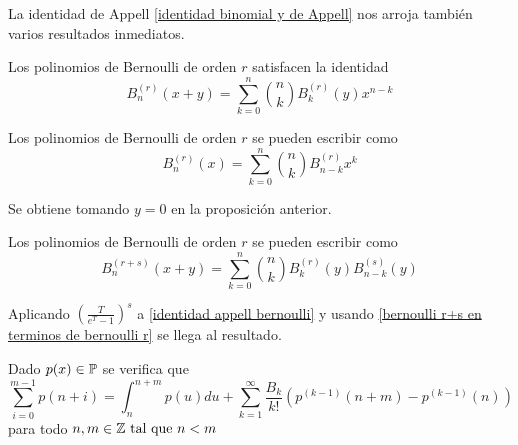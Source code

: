 La identidad de Appell \ref{identidad binomial y de Appell} nos arroja también varios resultados inmediatos.
\begin{proposicion}\label{identidad appell bernoulli}
    Los polinomios de Bernoulli de orden $r$ satisfacen la identidad
    \begin{equation*} 
    B_n^{(r)}(x + y) = \sum_{k=0}^n \binom{n}{k} B_k^{(r)}(y)x^{n-k}
    \end{equation*}
\end{proposicion}

\begin{corolario}\label{polinomios bernoulli funcion numeros bernoulli}
    Los polinomios de Bernoulli de orden $r$ se pueden escribir como
    \begin{equation*}
    B_n^{(r)}(x) = \sum_{k=0}^n \binom{n}{k} B_{n-k}^{(r)}x^k
    \end{equation*}
\end{corolario}

\begin{demo}
    Se obtiene tomando $y = 0$ en la proposición anterior.
\end{demo}

\begin{corolario}
    Los polinomios de Bernoulli de orden $r$ se pueden escribir como
    \begin{equation*}
     B_n^{(r+s)}(x + y) = \sum_{k=0}^n \binom{n}{k} B_k^{(r)}(y)B_{n-k}^{(s)}(y)
    \end{equation*}
\end{corolario}

\begin{demo}
    Aplicando $(\frac{T}{e^T - 1})^s$ a \ref{identidad appell bernoulli} y usando \ref{bernoulli r+s en terminos de bernoulli r} se llega al resultado.
\end{demo}

\begin{teorema}
    Dado $p(x) \in \mathbb{P}$ se verifica que
    \begin{equation*}
        \sum_{i=0}^{m-1} p(n+i) = \int_{n}^{n + m} p(u)du + \sum_{k = 1}^\infty \frac{B_k}{k!}\left(p^{(k-1)}(n + m) - p^{(k-1)}(n) \right)
    \end{equation*}
    para todo $n, m \in \mathbb{Z} \text{ tal que } n < m$
\end{teorema}

